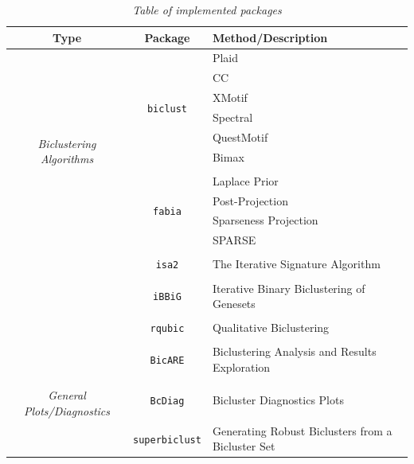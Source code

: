 \documentclass[a4paper]{article}\usepackage[]{graphicx}\usepackage[]{color}
\begin{document}
\begin{table}[H]
\centering
\begin{tabular}{ccl}
{\bf Type} & {\bf Package} & {\bf Method/Description}\\
\hline
\multirow{12}{*}{{\it Biclustering Algorithms}} &
\multirow{6}{*}{\texttt{biclust}} & Plaid \\
& & CC\\
& & XMotif\\
& & Spectral\\
& & QuestMotif\\
& & Bimax\\
& & \\
& \multirow{4}{*}{\texttt{fabia}} & Laplace Prior\\
& & Post-Projection\\
& & Sparseness Projection\\
& & SPARSE\\
& & \\
& \texttt{isa2} & The Iterative Signature Algorithm\\
& & \\
& \texttt{iBBiG} & Iterative Binary Biclustering of Genesets\\
& & \\
& \texttt{rqubic} & Qualitative Biclustering\\
& & \\
& \texttt{BicARE} & Biclustering Analysis and Results Exploration\\
& & \\
\hline
& & \\
\multirow{2}{*}{{\it General Plots/Diagnostics}} & \texttt{BcDiag} & Bicluster
Diagnostics Plots \\
& & \\
& \texttt{superbiclust} & Generating Robust Biclusters from a Bicluster Set
\end{tabular}
\caption{{\it Table of implemented packages}\label{package_table}}
\end{table}
\end{document}
